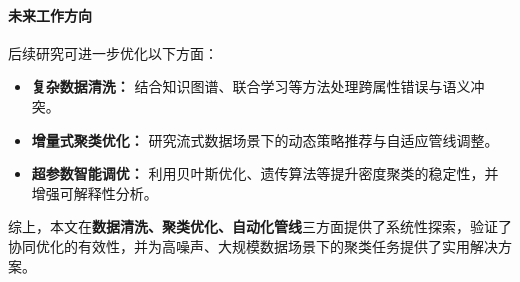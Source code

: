 \documentclass[10pt]{article} %
\numberwithin{equation}{section}
\begin{document}
\paragraph{未来工作方向}  
后续研究可进一步优化以下方面：
\begin{itemize}
    \item \textbf{复杂数据清洗：} 结合知识图谱、联合学习等方法处理跨属性错误与语义冲突。
    \item \textbf{增量式聚类优化：} 研究流式数据场景下的动态策略推荐与自适应管线调整。
    \item \textbf{超参数智能调优：} 利用贝叶斯优化、遗传算法等提升密度聚类的稳定性，并增强可解释性分析。
\end{itemize}

综上，本文在\textbf{数据清洗、聚类优化、自动化管线}三方面提供了系统性探索，验证了协同优化的有效性，并为高噪声、大规模数据场景下的聚类任务提供了实用解决方案。



\end{document}
